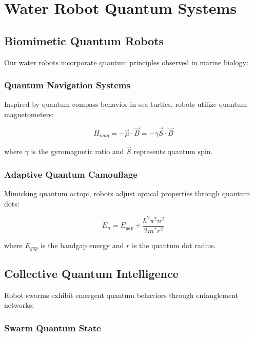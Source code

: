 \documentclass[11pt,a4paper]{article}
\begin{document}
\section{Water Robot Quantum Systems}

\subsection{Biomimetic Quantum Robots}

Our water robots incorporate quantum principles observed in marine biology:

\subsubsection{Quantum Navigation Systems}

Inspired by quantum compass behavior in sea turtles, robots utilize quantum magnetometers:

\begin{equation}
H_{mag} = -\vec{\mu} \cdot \vec{B} = -\gamma \vec{S} \cdot \vec{B}
\end{equation}

where $\gamma$ is the gyromagnetic ratio and $\vec{S}$ represents quantum spin.

\subsubsection{Adaptive Quantum Camouflage}

Mimicking quantum octopi, robots adjust optical properties through quantum dots:

\begin{equation}
E_n = E_{gap} + \frac{\hbar^2 \pi^2 n^2}{2m^*r^2}
\end{equation}

where $E_{gap}$ is the bandgap energy and $r$ is the quantum dot radius.

\subsection{Collective Quantum Intelligence}

Robot swarms exhibit emergent quantum behaviors through entanglement networks:

\subsubsection{Swarm Quantum State}
\end{document}
